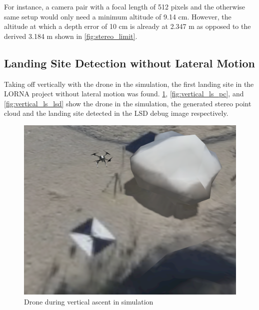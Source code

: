 For instance, a camera pair with a focal length of 512 pixels and the otherwise same setup would only need a minimum altitude of 9.14 cm. However, the altitude at which a depth error of 10 cm is already at  2.347 m as opposed to the derived
3.184 m shown in \cref{fig:stereo_limit}.

\subsection{Landing Site Detection without Lateral Motion}

Taking off vertically with the drone in the simulation, the first landing site in the LORNA project without lateral motion was found. \cref{fig:vertical_ls_sim}, \cref{fig:vertical_ls_pc}, and \cref{fig:vertical_ls_lsd} show the drone in the simulation, the generated stereo point cloud and the landing site detected in the LSD debug image respectively.

\begin{figure}
    \centering
    \includegraphics[scale=0.34]{images/stereo_camera_depth/ascent_sim.png}
    \caption{Drone during vertical ascent in simulation}
    \label{fig:vertical_ls_sim}
\end{figure}

